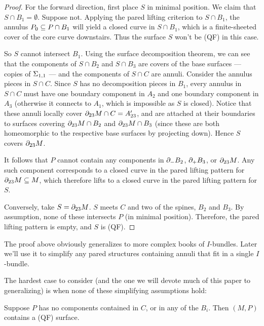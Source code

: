 \begin{proof}

For the forward direction, first place $S$ in minimal position. We claim that
$S\cap B_1=\emptyset$. Suppose not. Applying the pared lifting criterion to
$S\cap B_1$, the annulus $P_0\subseteq P \cap B_1$ will yield a closed curve in
$S\cap B_1$, which is a finite-sheeted cover of the core curve downstairs. Thus
the surface $S$ won't be (QF) in this case.

So $S$ cannot intersect $B_1$. Using the surface decomposition theorem, we can
see that the components of $S \cap B_2$ and $S \cap B_3$ are covers of the base
surfaces --- copies of $\Sigma_{1,1}$ --- and the components of $S \cap C$ are
annuli.  Consider the annulus pieces in $S \cap C$.  Since $S$ has no
decomposition pieces in $B_1$, every annulus in $S \cap C$ must have one
boundary component in $A_2$ and one boundary component in $A_3$ (otherwise it
connects to $A_1$, which is impossible as $S$ is closed). Notice that these
annuli locally cover $\partial_{23} M \cap C = A_{23}'$, and are attached at their
boundaries to surfaces covering $\partial_{23} M \cap B_2$ and $\partial_{23} M \cap B_3$
(since these are both homeomorphic to the respective base surfaces by
projecting down). Hence $S$ covers $\partial_{23} M$.

It follows that $P$ cannot contain any components in $\partial_- B_2$, $\partial_+ B_3$,
or $\partial_{23} M$.  Any such component corresponds to a closed curve in the pared
lifting pattern for $\partial_{23} M \subseteq M$, which therefore lifts to a closed
curve in the pared lifting pattern for $S$.

Conversely, take $S=\partial_{23}M$.  $S$ meets $C$ and two of the spines, $B_2$ and
$B_3$.  By assumption, none of these intersects $P$ (in minimal position).
Therefore, the pared lifting pattern is empty, and $S$ is (QF).

\end{proof}

The proof above obviously generalizes to more complex books of $I$-bundles.
Later we'll use it to simplify any pared structures containing annuli that fit
in a single $I$-bundle.

The hardest case to consider (and the one we will devote much of this paper to
generalizing) is when none of these simplifying assumptions hold:

\begin{thm}\label{T:ex1}

Suppose $P$ has no components contained in $C$, or in any of the $B_i$. Then
$(M,P)$ contains a (QF) surface.

\end{thm}

